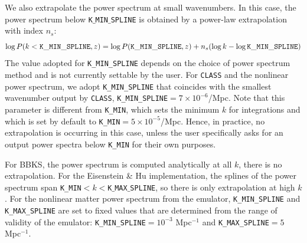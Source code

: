 \documentclass[\docopts]{\docclass}
\begin{document}
We also extrapolate the power spectrum at small wavenumbers. In this case,
the power spectrum below {\tt K$\_$MIN$\_$SPLINE} is obtained by a power-law
extrapolation with index $n_s$:
\begin{equation}
  \log P(k<{\tt K\_MIN\_SPLINE},z) = \log P({\tt K\_MIN\_SPLINE},z) + n_s (\log k-\log{\tt K\_MIN\_SPLINE})
\end{equation}
The value adopted for {\tt K\_MIN\_SPLINE} depends on the choice of power
spectrum method and is not currently settable by the user. For {\tt CLASS} and
the nonlinear power spectrum, we adopt {\tt K\_MIN\_SPLINE} that coincides with
the smallest wavenumber output by {\tt CLASS}, {\tt K\_MIN\_SPLINE}$=7\times 10^{-6}$/Mpc.
Note that this parameter is different from {\tt K\_MIN}, which sets the minimum
$k$ for integrations and which is set by default to {\tt K\_MIN}$=5\times 10^{-5}$/Mpc.
Hence, in practice, no extrapolation is occurring in this case, unless the user
specifically asks for an output power spectra below {\tt K\_MIN} for their own purposes.

For BBKS, the power spectrum is computed analytically at all $k$, there is no
extrapolation. For the Eisenstein \& Hu implementation, the splines of the power
spectrum span {\tt K\_MIN}$<k<${\tt K$\_$MAX$\_$SPLINE}, so there is only
extrapolation at high $k$. For the nonlinear matter power spectrum from the
emulator, {\tt K\_MIN\_SPLINE} and {\tt K\_MAX\_SPLINE} are set to fixed values
that are determined from the range of validity of the emulator:
{\tt K\_MIN\_SPLINE}$=10^{-3}$ Mpc$^{-1}$ and {\tt K\_MAX\_SPLINE}$=5$ Mpc$^{-1}$.
\end{document}

